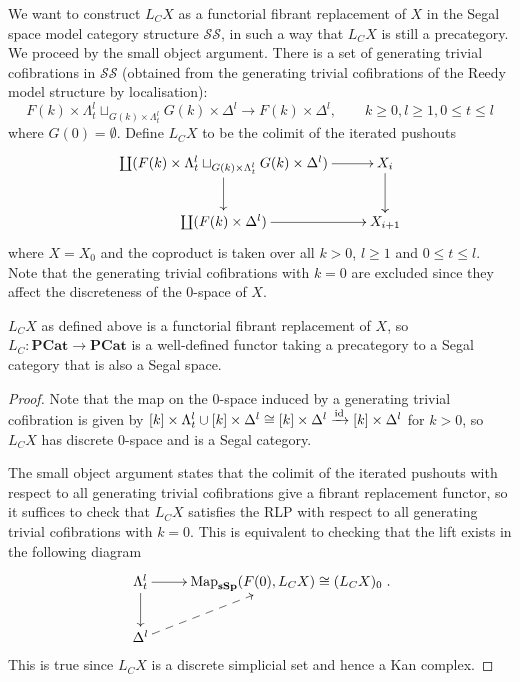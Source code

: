 \begin{refsection}
We want to construct $L_CX$ as a functorial fibrant replacement of $X$ in the Segal space model category structure $\mathcal{SS}$, in such a way that $L_CX$ is still a precategory. We proceed by the small object argument. There is a set of generating trivial cofibrations in $\mathcal{SS}$ (obtained from the generating trivial cofibrations of the Reedy model structure by localisation):
$$F(k)\times\Lambda^l_t\sqcup_{G(k)\times\Lambda^l_t}G(k)\times\Delta^l\to F(k)\times\Delta^l,\qquad k\ge0,l\ge1,0\le t\le l$$
where $G(0)=\emptyset$. Define $L_CX$ to be the colimit of the iterated pushouts
$$\xymatrix{\coprod(F(k)\times\Lambda^l_t\sqcup_{G(k)\times\Lambda^l_t}G(k)\times\Delta^l)\ar[r]\ar[d]&X_i\ar[d]\\
\coprod(F(k)\times\Delta^l)\ar[r]&X_{i+1}}$$
where $X=X_0$ and the coproduct is taken over all $k> 0$, $l\ge 1$ and $0\le t\le l$. Note that the generating trivial cofibrations with $k=0$ are excluded since they affect the discreteness of the 0-space of $X$.

\begin{prop}
$L_CX$ as defined above is a functorial fibrant replacement of $X$, so $L_C:\mathbf{PCat}\to\mathbf{PCat}$ is a well-defined functor taking a precategory to a Segal category that is also a Segal space.
\end{prop}
\begin{proof}
Note that the map on the 0-space induced by a generating trivial cofibration is given by $[k]\times\Lambda^l_t\cup[k]\times\Delta^l\cong [k]\times\Delta^l\xrightarrow{\mathrm{id}}[k]\times\Delta^l$ for $k> 0$, so $L_CX$ has discrete 0-space and is a Segal category.

The small object argument states that the colimit of the iterated pushouts with respect to all generating trivial cofibrations give a fibrant replacement functor, so it suffices to check that $L_CX$ satisfies the RLP with respect to all generating trivial cofibrations with $k=0$. This is equivalent to checking that the lift exists in the following diagram
$$\xymatrix{\Lambda^l_t\ar[r]\ar[d]&\Map_{\ssp}(F(0),L_CX)\cong (L_CX)_0\\\Delta^l\ar@{-->}[ur]}.$$
This is true since $L_CX$ is a discrete simplicial set and hence a Kan complex.
\end{proof}



\end{refsection}
